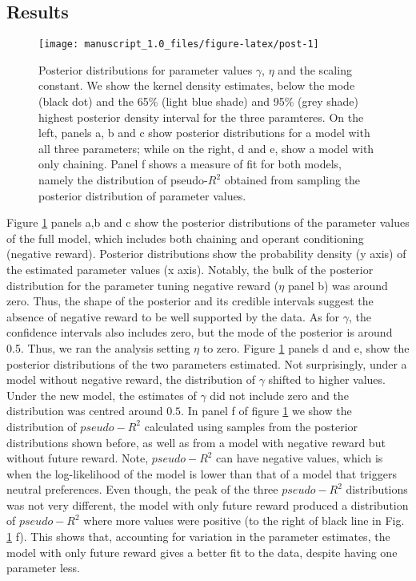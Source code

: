 \documentclass[]{rsos}%
\begin{document}
\hypertarget{results}{%
\subsection{Results}\label{results}}

\begin{figure}

{\centering \texttt{[image: manuscript\_1.0\_files/figure-latex/post-1]} 

}

\caption{Posterior distributions for parameter values $\gamma$, $\eta$ and the scaling constant. We show the kernel density estimates, below the mode (black dot) and the 65\% (light blue shade) and 95\% (grey shade)  highest posterior density interval for the three paramteres. On the left, panels a, b and c show posterior distributions for a model with all three parameters; while on the right, d and e, show a model with only chaining. Panel f shows a measure of fit for both models, namely the distribution of pseudo-$R^2$ obtained from sampling the posterior distribution of parameter values.}\label{fig:post}
\end{figure}

Figure \ref{fig:post} panels a,b and c show the posterior distributions
of the parameter values of the full model, which includes both chaining
and operant conditioning (negative reward). Posterior distributions show the probability
density (y axis) of the estimated parameter values (x axis). Notably,
the bulk of the posterior distribution for the parameter tuning negative
reward (\(\eta\) panel b) was around zero. Thus, the shape of the posterior
and its credible intervals suggest the absence of negative reward to be
well supported by the data. As for \(\gamma\), the confidence intervals
also includes zero, but the mode of the posterior is around 0.5. Thus,
we ran the analysis setting \(\eta\) to zero. Figure \ref{fig:post} panels
d and e, show the posterior distributions of the two parameters
estimated. Not surprisingly, under a model without negative reward, the
distribution of \(\gamma\) shifted to higher values. Under the new model,
the estimates of \(\gamma\) did not include zero and the distribution was
centred around \(0.5\). In panel f of figure \ref{fig:post}
we show the distribution of \(pseudo-R^2\) calculated using
samples from the posterior distributions shown before,
as well as from a model with negative reward but without
future reward. Note, \(pseudo-R^2\) can have negative values, which is when
the log-likelihood of the model is lower than that of a model that
triggers neutral preferences. Even though, the peak of the three
\(pseudo-R^2\) distributions was not very different, the model with only
future reward produced a distribution of \(pseudo-R^2\) where more values
were positive (to the right of black line in Fig. \ref{fig:post} f). This
shows that, accounting for variation in the parameter estimates, the
model with only future reward gives a better fit to the data, despite
having one parameter less.
\end{document}
